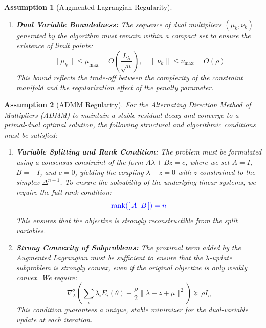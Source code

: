 \documentclass[preprint,12pt,authoryear]{elsarticle}
\newtheorem{assumption}{Assumption}
\begin{document}
\begin{assumption}[Augmented Lagrangian Regularity]
\begin{enumerate}
    \item \textbf{Dual Variable Boundedness:} The sequence of dual multipliers $(\mu_k, \nu_k)$ generated by the algorithm must remain within a compact set to ensure the existence of limit points:
    \begin{equation}
        \|\mu_k\| \leq \mu_{\max} = O\left(\frac{L_\lambda}{\sqrt{n}}\right), \quad \|\nu_k\| \leq \nu_{\max} = O\left(\rho\right)
    \end{equation}
    This bound reflects the trade-off between the complexity of the constraint manifold and the regularization effect of the penalty parameter.
\end{enumerate}
\end{assumption}


\begin{assumption}[ADMM Regularity]\label{assump:admm}
For the Alternating Direction Method of Multipliers (ADMM) to maintain a stable residual decay and converge to a primal-dual optimal solution, the following structural and algorithmic conditions must be satisfied:

\begin{enumerate}
    \item \textbf{Variable Splitting and Rank Condition:} The problem must be formulated using a consensus constraint of the form $A\lambda + Bz = c$, where we set $A=I$, $B=-I$, and $c=0$, yielding the coupling $\lambda - z = 0$ with $z$ constrained to the simplex $\Delta^{n-1}$. To ensure the solvability of the underlying linear systems, we require the full-rank condition:
    \begin{equation}
        \textcolor{blue}{\operatorname{rank}([\,A \;\; B\,]) = n}
    \end{equation}
    This ensures that the objective is strongly reconstructible from the split variables.

    \item \textbf{Strong Convexity of Subproblems:} The proximal term added by the Augmented Lagrangian must be sufficient to ensure that the $\lambda$-update subproblem is strongly convex, even if the original objective is only weakly convex. We require:
    \begin{equation}
        \nabla^2_\lambda\left(\sum_i \lambda_i E_i(\theta) + \frac{\rho}{2}\|\lambda - z + \mu\|^2\right) \succeq \rho I_n
    \end{equation}
    This condition guarantees a unique, stable minimizer for the dual-variable update at each iteration.


\end{enumerate}
\end{assumption}
\end{document}
